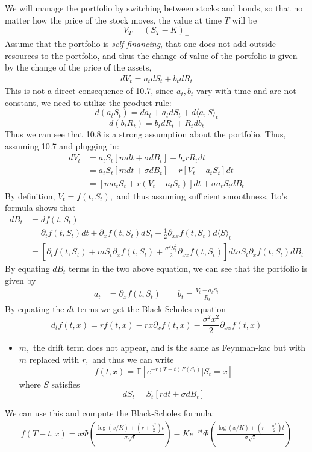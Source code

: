 \documentclass[oneside]{book}
\newcommand{\bbE}{\mathbb{E}}
\begin{document}
We will manage the portfolio by switching between stocks and bonds, so that no matter how the price of the stock moves, the value at time $T$ will be 
\[V_T = (S_T - K)_+\]
Assume that the portfolio is \textit{self financing}, that one does not add outside resources to the portfolio, and thus the change of value of the portfolio is given by the change of the price of the assets,
\begin{align}
   dV_t = a_tdS_t + b_tdR_t 
\end{align}
This is not a direct consequence of 10.7, since $a_t,b_t$ vary with time and are not constant, we need to utilize the product rule:
\[d(a_tS_t)= da_t + a_tdS_t + d\langle a,S\rangle_t\]
\[d(b_tR_t) = b_tdR_t + R_tdb_t\]
Thus we can see that 10.8 is a strong assumption about the portfolio. Thus, assuming 10.7 and plugging in:
\begin{align}
    dV_t &= a_tS_t[mdt + \sigma dB_t] + b_r rR_t dt \nonumber\\
    &= a_tS_t[mdt + \sigma dB_t]  + r[V_t - a_tS_t]dt\nonumber\\
    &= [ma_t S_t + r(V_t - a_t S_t)]dt + \sigma a_tS_t dB_t
\end{align}
By definition, $V_t = f(t,S_t),$ and thus assuming sufficient smoothness, Ito's formula shows that 
\begin{align}
    dB_t &= df(t,S_t)\nonumber\\
    &= \partial_t f(t,S_t)dt + \partial_x f(t,S_t)dS_t + \frac{1}{2}\partial_{xx}f(t,S_t)d\langle S \rangle_t\nonumber\\
    &= \left[\partial_t f(t,S_t) + mS_t\partial_x f(t,S_t) + \frac{\sigma^2 S_t^2}{2}\partial_{xx}f(t,S_t)\right]dt \sigma S_t \partial_x f(t,S_t)dB_t
\end{align}
By equating $dB_t$ terms in the two above equation, we can see that the portfolio is given by
\begin{align}
    a_t &= \partial_x f(t,S_t)\qquad b_t = \frac{V_t - a_tS_t}{R_t}
\end{align}
By equating the $dt$ terms we get the Black-Scholes equation
\[d_t f(t,x) = rf(t,x) - rx\partial_x f(t,x) - \frac{\sigma^2 x^2}{2}\partial_{xx}f(t,x)\]
\begin{itemize}
    \item $m,$ the drift term does not appear, and is the same as Feynman-kac but with $m$ replaced with $r,$  and thus we can write
    \[f(t,x) = \bbE[e^{-r(T-t)F(S_t)} | S_t = x]\] where $S$ satisfies 
    \[dS_t = S_t[rdt + \sigma dB_t]\]
\end{itemize}
We can use this and compute the Black-Scholes formula:
\begin{align}
    f(T-t,x) = x\Phi \left(\frac{\log(x/K) + (r + \frac{\sigma^2    }{2})t}{\sigma\sqrt{t}}\right) - Ke^{-rt}\Phi\left(\frac{\log(x/K) + (r-\frac{\sigma^2}{2})t}{\sigma\sqrt{t}}\right)
\end{align}
\end{document}
